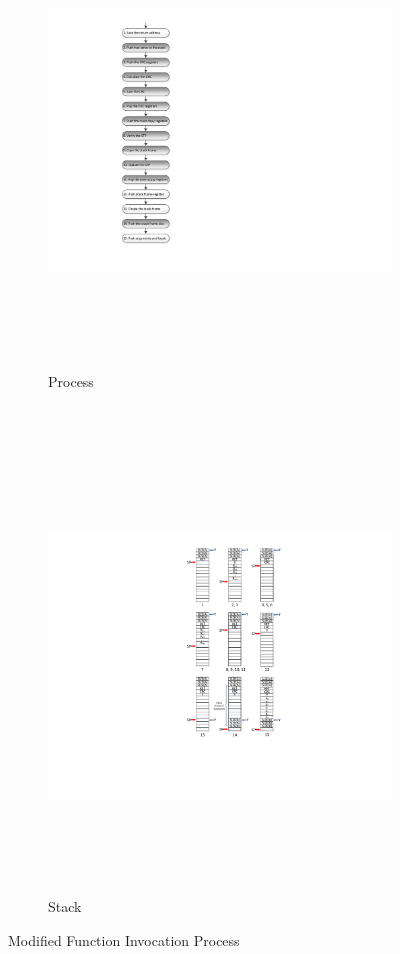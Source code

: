\begin{figure}[h]
        \centering
        \begin{subfigure}[b]{0.4\columnwidth}
                \includegraphics[width=\textwidth, height=12cm]{figures/modified_function_operations_process_pre_execution_v2}
                \caption{Process}
                \label{fig:modified_function_operation_process_pre_execution}
        \end{subfigure}~
        \begin{subfigure}[b]{0.6\columnwidth}
                \includegraphics[width=\textwidth, height=12cm]{figures/modified_function_operations_stack_pre_execution_v2}
                \caption{Stack}
                \label{fig:modified_function_operation_stack_pre_execution}
        \end{subfigure}
		\vspace{10pt}
        \caption{Modified Function Invocation Process}\label{fig:modified_function_operation_pre_execution}
\end{figure}

